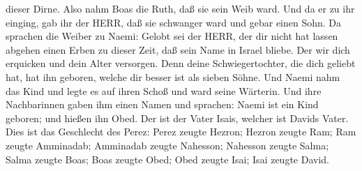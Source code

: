 dieser Dirne.  Also nahm Boas die Ruth, daß sie sein Weib
ward. Und da er zu ihr einging, gab ihr der HERR, daß sie schwanger ward
und gebar einen Sohn.  Da sprachen die Weiber zu Naemi:
Gelobt sei der HERR, der dir nicht hat lassen abgehen einen Erben zu
dieser Zeit, daß sein Name in Israel bliebe.  Der wir dich
erquicken und dein Alter versorgen. Denn deine Schwiegertochter, die
dich geliebt hat, hat ihn geboren, welche dir besser ist als sieben
Söhne.  Und Naemi nahm das Kind und legte es auf ihren
Schoß und ward seine Wärterin.  Und ihre Nachbarinnen gaben
ihm einen Namen und sprachen: Naemi ist ein Kind geboren; und hießen ihn
Obed. Der ist der Vater Isais, welcher ist Davids Vater. 
Dies ist das Geschlecht des Perez: Perez zeugte Hezron; 
Hezron zeugte Ram; Ram zeugte Amminadab;  Amminadab zeugte
Nahesson; Nahesson zeugte Salma;  Salma zeugte Boas; Boas
zeugte Obed;  Obed zeugte Isai; Isai zeugte David.
